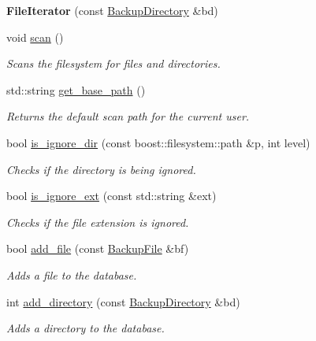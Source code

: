 \begin{DoxyCompactItemize}
\item 
\mbox{\label{class_vessel_1_1_file_1_1_file_iterator_a0607caa735b9d506bfa7dcdc635416a2}} 
{\bfseries File\+Iterator} (const \hyperlink{class_vessel_1_1_file_1_1_backup_directory}{Backup\+Directory} \&bd)
\item 
\mbox{\label{class_vessel_1_1_file_1_1_file_iterator_a23c4a395200a4a77abacd716fed5cb14}} 
void \hyperlink{class_vessel_1_1_file_1_1_file_iterator_a23c4a395200a4a77abacd716fed5cb14}{scan} ()
\begin{DoxyCompactList}\small\item\em Scans the filesystem for files and directories. \end{DoxyCompactList}\item 
std\+::string \hyperlink{class_vessel_1_1_file_1_1_file_iterator_a8701998833ac62c2618d815fc100f6d1}{get\+\_\+base\+\_\+path} ()
\begin{DoxyCompactList}\small\item\em Returns the default scan path for the current user. \end{DoxyCompactList}\item 
bool \hyperlink{class_vessel_1_1_file_1_1_file_iterator_aed179f0336b6955a56fc97905404faef}{is\+\_\+ignore\+\_\+dir} (const boost\+::filesystem\+::path \&p, int level)
\begin{DoxyCompactList}\small\item\em Checks if the directory is being ignored. \end{DoxyCompactList}\item 
bool \hyperlink{class_vessel_1_1_file_1_1_file_iterator_a6f285e42ac14fcb265d72299131b1ffe}{is\+\_\+ignore\+\_\+ext} (const std\+::string \&ext)
\begin{DoxyCompactList}\small\item\em Checks if the file extension is ignored. \end{DoxyCompactList}\item 
bool \hyperlink{class_vessel_1_1_file_1_1_file_iterator_a89f4f4d25b18640d3201c558d56cbb5d}{add\+\_\+file} (const \hyperlink{class_vessel_1_1_file_1_1_backup_file}{Backup\+File} \&bf)
\begin{DoxyCompactList}\small\item\em Adds a file to the database. \end{DoxyCompactList}\item 
int \hyperlink{class_vessel_1_1_file_1_1_file_iterator_a131ad68618d2f9d649ca28cf5fa923f5}{add\+\_\+directory} (const \hyperlink{class_vessel_1_1_file_1_1_backup_directory}{Backup\+Directory} \&bd)
\begin{DoxyCompactList}\small\item\em Adds a directory to the database. \end{DoxyCompactList}\end{DoxyCompactItemize}


